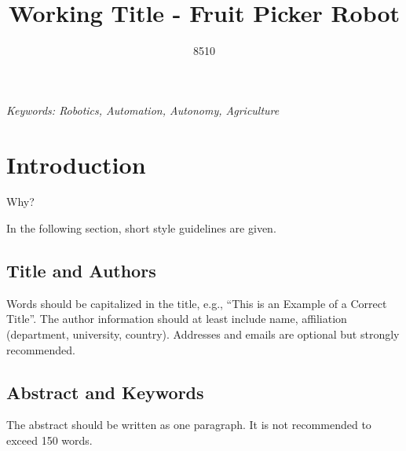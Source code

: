 \documentclass{modelica}
\begin{document}
\thispagestyle{empty}

\title{Working Title - Fruit Picker Robot}
\author[1]{8510}


\maketitle\thispagestyle{empty} %

\noindent\emph{Keywords: Robotics, Automation, Autonomy, Agriculture}

\section{Introduction}
Why?

In the following section, short style guidelines are given.

\subsection{Title and Authors}
Words should be capitalized in the title, e.g., ``This is an Example of
a Correct Title''.  The author information should at least include
name, affiliation (department, university, country). Addresses and
emails are optional but strongly recommended.

\subsection{Abstract and Keywords}

The abstract should be written as one paragraph. It is not recommended
to exceed 150 words.
\end{document}
